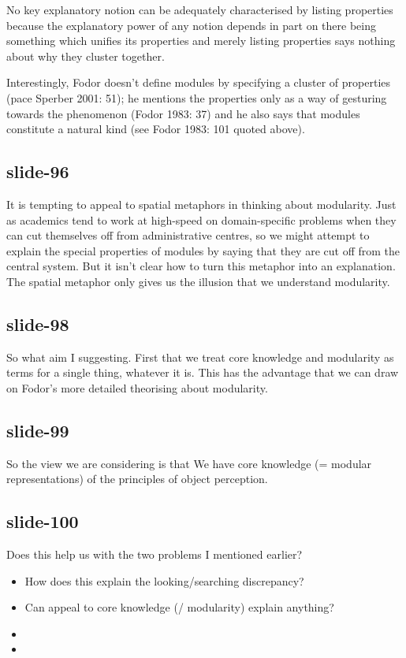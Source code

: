\documentclass[12pt,\papersize]{extarticle}
\begin{document}
No key explanatory notion can be adequately characterised by listing properties because the explanatory power of any notion depends in part on there being something which unifies its properties and merely listing properties says nothing about why they cluster together.
 
Interestingly, Fodor doesn't define modules by specifying a cluster of properties (pace Sperber 2001: 51); he mentions the properties only as a way of gesturing towards the phenomenon (Fodor 1983: 37) and he also says that modules constitute a natural kind (see Fodor 1983: 101 quoted above).
 
 
\subsection{slide-96}
It is tempting to appeal to spatial metaphors in thinking about modularity. Just as academics tend to work at high-speed on domain-specific problems when they can cut themselves off from administrative centres, so we might attempt to explain the special properties of modules by saying that they are cut off from the central system. But it isn't clear how to turn this metaphor into an explanation. The spatial metaphor only gives us the illusion that we understand modularity.
 
 
\subsection{slide-98}
So what aim I suggesting.
First that we treat core knowledge and modularity as terms for a single thing, whatever it is.
This has the advantage that we can draw on Fodor's more detailed theorising about modularity.
 
 
\subsection{slide-99}
So the view we are considering is that
We have core knowledge (= modular representations) of the principles of object perception.
 
 
\subsection{slide-100}
Does this help us with the two problems I mentioned earlier?
\begin{itemize} \item How does this explain the looking/searching discrepancy? \item Can appeal to core knowledge (/ modularity) explain anything? \end{itemize}
\begin{itemize}
\item
\item
\end{itemize}
 
\end{document}
